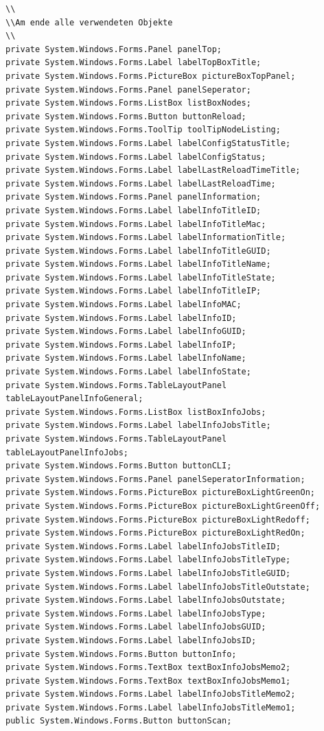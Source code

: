 \documentclass[12pt,a4paper]{report}
\begin{document}
\begin{onehalfspace}
\begin{lstlisting}
\\
\\Am ende alle verwendeten Objekte
\\
private System.Windows.Forms.Panel panelTop;
private System.Windows.Forms.Label labelTopBoxTitle;
private System.Windows.Forms.PictureBox pictureBoxTopPanel;
private System.Windows.Forms.Panel panelSeperator;
private System.Windows.Forms.ListBox listBoxNodes;
private System.Windows.Forms.Button buttonReload;
private System.Windows.Forms.ToolTip toolTipNodeListing;
private System.Windows.Forms.Label labelConfigStatusTitle;
private System.Windows.Forms.Label labelConfigStatus;
private System.Windows.Forms.Label labelLastReloadTimeTitle;
private System.Windows.Forms.Label labelLastReloadTime;
private System.Windows.Forms.Panel panelInformation;
private System.Windows.Forms.Label labelInfoTitleID;
private System.Windows.Forms.Label labelInfoTitleMac;
private System.Windows.Forms.Label labelInformationTitle;
private System.Windows.Forms.Label labelInfoTitleGUID;
private System.Windows.Forms.Label labelInfoTitleName;
private System.Windows.Forms.Label labelInfoTitleState;
private System.Windows.Forms.Label labelInfoTitleIP;
private System.Windows.Forms.Label labelInfoMAC;
private System.Windows.Forms.Label labelInfoID;
private System.Windows.Forms.Label labelInfoGUID;
private System.Windows.Forms.Label labelInfoIP;
private System.Windows.Forms.Label labelInfoName;
private System.Windows.Forms.Label labelInfoState;
private System.Windows.Forms.TableLayoutPanel tableLayoutPanelInfoGeneral;
private System.Windows.Forms.ListBox listBoxInfoJobs;
private System.Windows.Forms.Label labelInfoJobsTitle;
private System.Windows.Forms.TableLayoutPanel tableLayoutPanelInfoJobs;
private System.Windows.Forms.Button buttonCLI;
private System.Windows.Forms.Panel panelSeperatorInformation;
private System.Windows.Forms.PictureBox pictureBoxLightGreenOn;
private System.Windows.Forms.PictureBox pictureBoxLightGreenOff;
private System.Windows.Forms.PictureBox pictureBoxLightRedoff;
private System.Windows.Forms.PictureBox pictureBoxLightRedOn;
private System.Windows.Forms.Label labelInfoJobsTitleID;
private System.Windows.Forms.Label labelInfoJobsTitleType;
private System.Windows.Forms.Label labelInfoJobsTitleGUID;
private System.Windows.Forms.Label labelInfoJobsTitleOutstate;
private System.Windows.Forms.Label labelInfoJobsOutstate;
private System.Windows.Forms.Label labelInfoJobsType;
private System.Windows.Forms.Label labelInfoJobsGUID;
private System.Windows.Forms.Label labelInfoJobsID;
private System.Windows.Forms.Button buttonInfo;
private System.Windows.Forms.TextBox textBoxInfoJobsMemo2;
private System.Windows.Forms.TextBox textBoxInfoJobsMemo1;
private System.Windows.Forms.Label labelInfoJobsTitleMemo2;
private System.Windows.Forms.Label labelInfoJobsTitleMemo1;
public System.Windows.Forms.Button buttonScan;
\end{lstlisting}


\end{onehalfspace}
\end{document}
